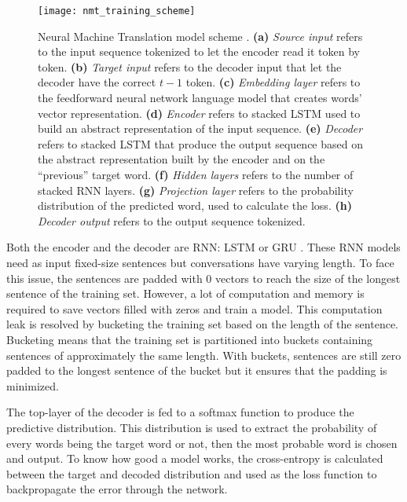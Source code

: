 \begin{figure}
    \centering
    \texttt{[image: nmt\_training\_scheme]}
    \decoRule
    \caption[Neural Machine Translation model scheme]{Neural Machine Translation model scheme \citep{tensorflow.nmt}. \textbf{(a)} \textit{Source input} refers to the input sequence tokenized to let the encoder read it token by token. \textbf{(b)} \textit{Target input} refers to the decoder input that let the decoder have the correct $t-1$ token. \textbf{(c)} \textit{Embedding layer} refers to the feedforward neural network language model that creates words' vector representation. \textbf{(d)} \textit{Encoder} refers to stacked LSTM used to build an abstract representation of the input sequence. \textbf{(e)} \textit{Decoder} refers to stacked LSTM that produce the output sequence based on the abstract representation built by the encoder and on the ``previous'' target word. \textbf{(f)} \textit{Hidden layers} refers to the number of stacked RNN layers. \textbf{(g)} \textit{Projection layer} refers to the probability distribution of the predicted word, used to calculate the loss. \textbf{(h)} \textit{Decoder output} refers to the output sequence tokenized.}
    \label{fig:nmt}
\end{figure}

Both the encoder and the decoder are RNN: LSTM \citep{1409.3215,1508.04025} or GRU \citep{1706.05125,1503.02364}. These RNN models need as input fixed-size sentences but conversations have varying length. To face this issue, the sentences are padded with $0$ vectors to reach the size of the longest sentence of the training set. However, a lot of computation and memory is required to save vectors filled with zeros and train a model. This computation leak is resolved by bucketing the training set based on the length of the sentence.
Bucketing means that the training set is partitioned into buckets containing sentences of approximately the same length. With buckets, sentences are still zero padded to the longest sentence of the bucket but it ensures that the padding is minimized.


The top-layer of the decoder is fed to a softmax function to produce the predictive distribution. This distribution is used to extract the probability of every words being the target word or not, then the most probable word is chosen and output. To know how good a model works, the cross-entropy is calculated between the target and decoded distribution and used as the loss function to backpropagate the error through the network.


